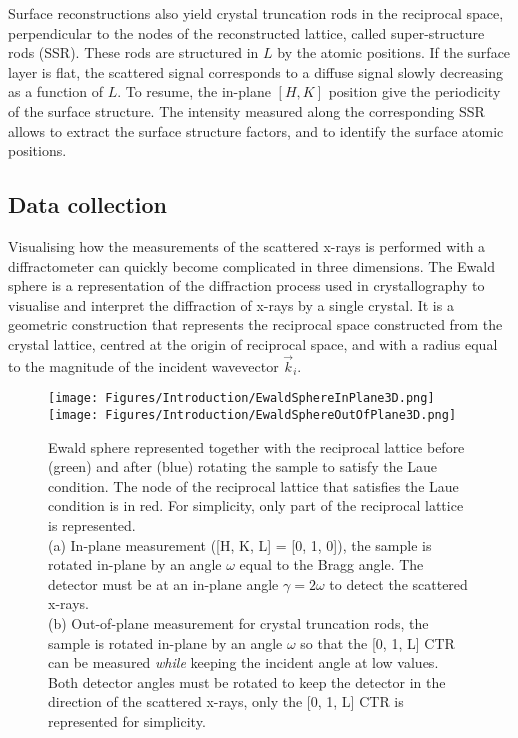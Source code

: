 Surface reconstructions also yield crystal truncation rods in the reciprocal space, perpendicular to the nodes of the reconstructed lattice, called super-structure rods (SSR).
These rods are structured in $L$ by the atomic positions.
If the surface layer is flat, the scattered signal corresponds to a diffuse signal slowly decreasing as a function of $L$.
To resume, the in-plane $[H, K]$ position give the periodicity of the surface structure.
The intensity measured along the corresponding SSR allows to extract the surface structure factors, and to identify the surface atomic positions.

\subsection{Data collection} \label{sec:DataCollectionSXRD}

Visualising how the measurements of the scattered x-rays is performed with a diffractometer can quickly become complicated in three dimensions.
The Ewald sphere is a representation of the diffraction process used in crystallography to visualise and interpret the diffraction of x-rays by a single crystal.
It is a geometric construction that represents the reciprocal space constructed from  the crystal lattice, centred at the origin of reciprocal space, and with a radius equal to the magnitude of the incident wavevector $\vec{k}_i$.

\begin{figure}[!htb]
    \centering
    \texttt{[image: Figures/Introduction/EwaldSphereInPlane3D.png]}
    \texttt{[image: Figures/Introduction/EwaldSphereOutOfPlane3D.png]}
    \caption{
    Ewald sphere represented together with the reciprocal lattice before (green) and after (blue) rotating the sample to satisfy the Laue condition.
    The node of the reciprocal lattice that satisfies the Laue condition is in red.
    For simplicity, only part of the reciprocal lattice is represented.\\
    (a) In-plane measurement ([H, K, L] = [0, 1, 0]), the sample is rotated in-plane by an angle $\omega$ equal to the Bragg angle.
    The detector must be at an in-plane angle $\gamma=2\omega$ to detect the scattered x-rays.\\
    (b) Out-of-plane measurement for crystal truncation rods, the sample is rotated in-plane by an angle $\omega$ so that the [0, 1, L] CTR can be measured \textit{while} keeping the incident angle at low values.
    Both detector angles must be rotated to keep the detector in the direction of the scattered x-rays, only the [0, 1, L] CTR is represented for simplicity.
    }
    \label{fig:EwaldSphere}
\end{figure}

